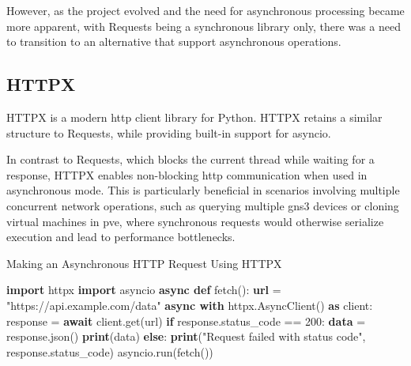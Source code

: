   However, as the project evolved and the need for asynchronous processing became more apparent, with Requests being a 
  synchronous library only, there was a need to transition to an alternative that support asynchronous operations.

\subsection{HTTPX}

  HTTPX\cite{httpx2025} is a modern \ac{http} client library for Python. HTTPX retains a similar structure to 
  Requests, while providing  built-in support for asyncio.

  In contrast to Requests, which blocks the current thread while waiting for a response, HTTPX enables non-blocking 
  \ac{http} communication when used in asynchronous mode. This is particularly beneficial in scenarios involving multiple 
  concurrent network operations, such as querying multiple \ac{gns3} devices or cloning virtual machines in \ac{pve}, 
  where synchronous requests would otherwise serialize execution and lead to performance bottlenecks.

  \begin{algorithm}
    \caption{Making an Asynchronous HTTP Request Using HTTPX}\label{httpx-basic}
    \begin{algorithmic}[1]
      \State \textbf{import} httpx
      \State \textbf{import} asyncio
      \State
      \State \textbf{async def} fetch():
      \State \hspace{1em} \textbf{url} = "https://api.example.com/data"
      \State \hspace{1em} \textbf{async with} httpx.AsyncClient() \textbf{as} client:
      \State \hspace{2em} response = \textbf{await} client.get(url)
      \State \hspace{2em} \textbf{if} response.status\_code == 200:
      \State \hspace{3em} \textbf{data} = response.json()
      \State \hspace{3em} \textbf{print}(data)
      \State \hspace{2em} \textbf{else}:
      \State \hspace{3em} \textbf{print}("Request failed with status code", response.status\_code)
      \State
      \State asyncio.run(fetch())
    \end{algorithmic}
  \end{algorithm}

